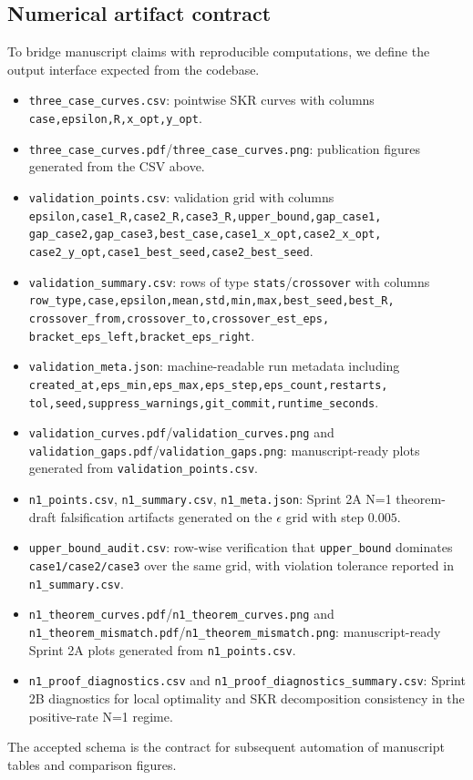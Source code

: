 \documentclass[a4paper,twocolumn,11pt,unpublished]{quantumarticle}
\begin{document}
\subsection{Numerical artifact contract}
To bridge manuscript claims with reproducible computations, we define the output
interface expected from the codebase.
\begin{itemize}
    \item \texttt{three\_case\_curves.csv}: pointwise SKR curves with columns
    \texttt{case,epsilon,R,x\_opt,y\_opt}.
    \item \texttt{three\_case\_curves.pdf}/\texttt{three\_case\_curves.png}:
    publication figures generated from the CSV above.
    \item \texttt{validation\_points.csv}: validation grid with columns
    \texttt{epsilon,case1\_R,case2\_R,case3\_R,upper\_bound,gap\_case1,%
    gap\_case2,gap\_case3,best\_case,case1\_x\_opt,case2\_x\_opt,%
    case2\_y\_opt,case1\_best\_seed,case2\_best\_seed}.
    \item \texttt{validation\_summary.csv}: rows of type
    \texttt{stats}/\texttt{crossover} with columns
    \texttt{row\_type,case,epsilon,mean,std,min,max,best\_seed,best\_R,%
    crossover\_from,crossover\_to,crossover\_est\_eps,%
    bracket\_eps\_left,bracket\_eps\_right}.
    \item \texttt{validation\_meta.json}:
    machine-readable run metadata including
    \texttt{created\_at,eps\_min,eps\_max,eps\_step,eps\_count,restarts,%
    tol,seed,suppress\_warnings,git\_commit,runtime\_seconds}.
    \item \texttt{validation\_curves.pdf}/\texttt{validation\_curves.png} and
    \texttt{validation\_gaps.pdf}/\texttt{validation\_gaps.png}:
    manuscript-ready plots generated from \texttt{validation\_points.csv}.
    \item \texttt{n1\_points.csv}, \texttt{n1\_summary.csv},
    \texttt{n1\_meta.json}:
    Sprint 2A N=1 theorem-draft falsification artifacts generated on the
    $\epsilon$ grid with step $0.005$.
    \item \texttt{upper\_bound\_audit.csv}: row-wise verification that
    \texttt{upper\_bound} dominates \texttt{case1/case2/case3} over the same
    grid, with violation tolerance reported in \texttt{n1\_summary.csv}.
    \item \texttt{n1\_theorem\_curves.pdf}/\texttt{n1\_theorem\_curves.png}
    and
    \texttt{n1\_theorem\_mismatch.pdf}/\texttt{n1\_theorem\_mismatch.png}:
    manuscript-ready Sprint 2A plots generated from \texttt{n1\_points.csv}.
    \item \texttt{n1\_proof\_diagnostics.csv} and
    \texttt{n1\_proof\_diagnostics\_summary.csv}: Sprint 2B diagnostics for
    local optimality and SKR decomposition consistency in the positive-rate
    N=1 regime.
\end{itemize}
The accepted schema is the contract for subsequent automation of manuscript
tables and comparison figures.
\end{document}
